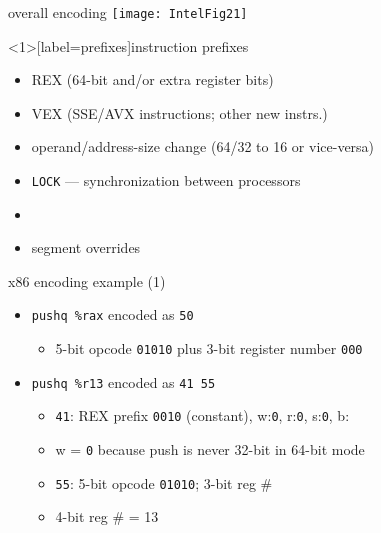\begin{frame}{overall encoding}
\texttt{[image: IntelFig21]}
\end{frame}

\begin{frame}<1>[label=prefixes]{instruction prefixes}
    \begin{itemize}
    \item REX (64-bit and/or extra register bits)
    \item VEX (SSE/AVX instructions; other new instrs.)
    \item operand/address-size change (64/32 to 16 or vice-versa)
    \item {\tt LOCK} --- synchronization between processors
    \item {}
    \item segment overrides
    \end{itemize}
\end{frame}

\begin{frame}[fragile,label=x86ex1]{x86 encoding example (1)}
    \begin{itemize}
    \item \lstinline|pushq %rax| encoded as {\tt 50}
        \begin{itemize}
        \item 5-bit opcode {\tt 01010} plus 3-bit register number {\tt 000}
        \end{itemize}
    \item \lstinline|pushq %r13| encoded as {\tt 41 55}
        \begin{itemize}
        \item {\tt 41}: REX prefix {\tt 0010} (constant), w:{\tt 0}, r:{\tt 0}, s:{\tt 0}, b:{\tt \color{blue!80!black}{1}}
        \item w = {\tt 0} because push is never 32-bit in 64-bit mode
        \item {\tt 55}: 5-bit opcode {\tt 01010}; 3-bit reg \# {\tt \color{green!80!black}{101}}
        \item 4-bit reg \# {\tt \color{blue!80!black}{1}\color{green!80!black}{101}} = 13
        \end{itemize}
    \end{itemize}
\end{frame}

